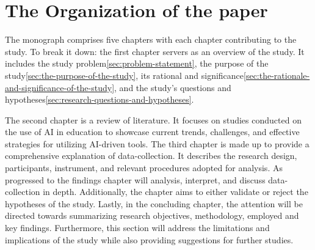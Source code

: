 \section{The Organization of the paper}\label{sec:the-organization-of-the-paper}
\justifying
The monograph comprises five chapters with each chapter contributing to the study.
To break it down:
the first chapter servers as an overview of the study.
It includes the study problem\ref{sec:problem-statement}, the purpose of the study\ref{sec:the-purpose-of-the-study},
its rational and significance\ref{sec:the-rationale-and-significance-of-the-study},
and the study's questions and hypotheses\ref{sec:research-questions-and-hypotheses}.

The second chapter is a review of literature.
It focuses on studies conducted on the use of AI in education
to showcase current trends, challenges, and effective strategies
for utilizing AI-driven tools.
The third chapter is made up to provide a comprehensive explanation of data-collection.
It describes the research design, participants, instrument, and relevant procedures
adopted for analysis.
As progressed to the findings chapter will analysis, interpret, and discuss data-collection in depth.
Additionally, the chapter aims to either validate or reject the hypotheses of the study.
Lastly, in the concluding chapter, the attention will be directed
towards summarizing research objectives, methodology, employed
and key findings.
Furthermore, this section will address the limitations and
implications of the study while also providing suggestions
for further studies.

